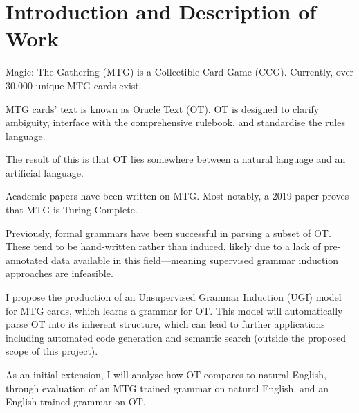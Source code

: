 \documentclass{article}
\begin{document}
\section{Introduction and Description of Work}
Magic: The Gathering (MTG) is a Collectible Card Game (CCG). Currently, over 30,000 unique MTG cards exist.

MTG cards' text is known as Oracle Text (OT). OT is designed to clarify ambiguity, interface with the comprehensive rulebook, and standardise the rules language.

The result of this is that OT lies somewhere between a natural language and an artificial language.

Academic papers have been written on MTG. Most notably, a 2019 paper proves that MTG is Turing Complete.

Previously, formal grammars have been successful in parsing a subset of OT. These tend to be hand-written rather than induced, likely due to a lack of pre-annotated data available in this field---meaning supervised grammar induction approaches are infeasible.\bigskip

I propose the production of an Unsupervised Grammar Induction (UGI) model for MTG cards, which learns a grammar for OT. This model will automatically parse OT into its inherent structure, which can lead to further applications including automated code generation and semantic search (outside the proposed scope of this project).

As an initial extension, I will analyse how OT compares to natural English, through evaluation of an MTG trained grammar on natural English, and an English trained grammar on OT. \bigskip
\end{document}
